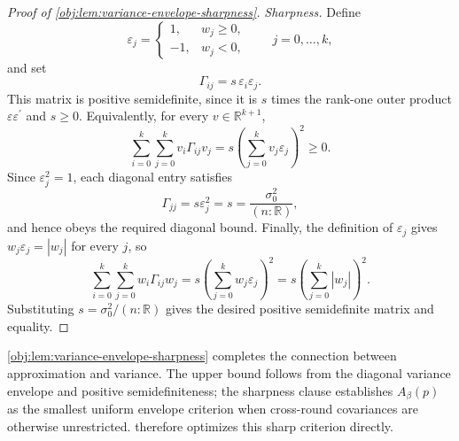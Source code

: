 \documentclass[11pt]{article}
\begin{document}
\begin{proof}[Proof of \cref{obj:lem:variance-envelope-sharpness}]
\emph{Sharpness.}
Define
\[
\varepsilon_j=
\begin{cases}
1,& w_j\ge0,\\
-1,& w_j<0,
\end{cases}
\qquad j=0,\ldots,k,
\]
and set
\[
\Gamma_{ij}=s\,\varepsilon_i\varepsilon_j.
\]
This matrix is positive semidefinite, since it is \(s\) times the rank-one outer product \(\varepsilon\varepsilon^\prime\) and \(s\ge0\). Equivalently, for every \(v\in\mathbb R^{k+1}\),
\[
\sum_{i=0}^k\sum_{j=0}^k v_i\Gamma_{ij}v_j
=
s\left(\sum_{j=0}^k v_j\varepsilon_j\right)^2
\ge0.
\]
Since \(\varepsilon_j^2=1\), each diagonal entry satisfies
\[
\Gamma_{jj}=s\varepsilon_j^2=s=\frac{\sigma_0^2}{(n:\mathbb R)},
\]
and hence obeys the required diagonal bound. Finally, the definition of \(\varepsilon_j\) gives \(w_j\varepsilon_j=|w_j|\) for every \(j\), so
\[
\sum_{i=0}^k\sum_{j=0}^k w_i\Gamma_{ij}w_j
=
s\left(\sum_{j=0}^k w_j\varepsilon_j\right)^2
=
s\left(\sum_{j=0}^k |w_j|\right)^2.
\] %
Substituting \(s=\sigma_0^2/(n:\mathbb R)\) gives the desired positive semidefinite matrix and equality. %
\end{proof}

\cref{obj:lem:variance-envelope-sharpness} completes the connection between approximation and variance. The upper bound follows from the diagonal variance envelope and positive semidefiniteness; the sharpness clause establishes \(A_\beta(p)\) as the smallest uniform envelope criterion when cross-round covariances are otherwise unrestricted.  therefore optimizes this sharp criterion directly.
\end{document}
